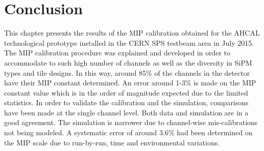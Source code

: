 \section{Conclusion}

This chapter presents the results of the MIP calibration obtained for the AHCAL technological prototype installed in the CERN SPS testbeam area in July 2015. The MIP calibration procedure was explained and developed in order to accommodate to such high number of channels as well as the diversity in SiPM types and tile designs. In this way, around 85\% of the channels in the detector have their MIP constant determined.
An error around 1-3\% is made on the MIP constant value which is in the order of magnitude expected due to the limited statistics. In order to validate the calibration and the simulation, comparisons have been made at the single channel level. Both data and simulation are in a good agreement. The simulation is narrower due to channel-wise mis-calibrations not being modeled. A systematic error of around 3.6\% had been determined on the MIP scale due to run-by-run, time and environmental variations.
